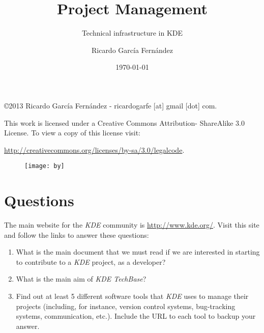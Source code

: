 \documentclass[11pt]{scrartcl}
\title{\textbf{Project Management}}
\subtitle{Technical infrastructure in KDE}
\author{Ricardo Garc\'ia Fern\'andez}
\date{\today}
\begin{document}
\maketitle

\vfill

\begin{flushright}
    \copyright  2013 Ricardo Garc\'ia Fern\'andez - ricardogarfe [at] gmail [dot] com.

    This work is licensed under a Creative Commons Attribution- ShareAlike 3.0 License.
    To view a copy of this license visit:
 
    \url{http://creativecommons.org/licenses/by-sa/3.0/legalcode}.
\end{flushright}

\begin{figure}[h]
    \begin{flushright}	
        \texttt{[image: by]}
        \label{fig:by-sa}
    \end{flushright}
\end{figure}

\newpage

\section{Questions}

The main website for the \emph{KDE} community is \url{http://www.kde.org/}. Visit this site and follow the links to answer these questions:

\begin{enumerate}
	\item What is the main document that we must read if we are interested in starting to contribute to a \emph{KDE} project, as a developer?
	\item What is the main aim of \emph{KDE TechBase}?
	\item Find out at least 5 different software tools that \emph{KDE} uses to manage their projects (including, for instance, version control systems, bug-tracking systems, communication, etc.). Include the URL to each tool to backup your answer.
\end{enumerate}
\end{document}
